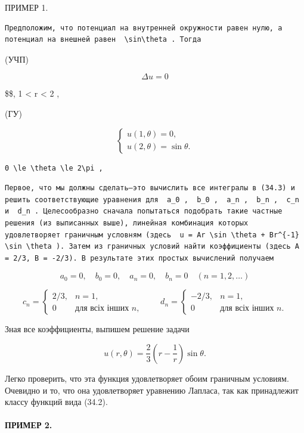 \documentclass[
  ukrainian,
]{article}
\begin{document}
ПРИМЕР 1.

\begin{verbatim}
Предположим, что потенциал на внутренней окружности равен нулю, а потенциал на внешней равен  \sin\theta . Тогда
\end{verbatim}

(УЧП)

\[
\Delta u = 0
\]

\$\$, 1 \textless{} r \textless{} 2 ,

(ГУ)

\[
\begin{cases} u(1, \theta) = 0, \\ u(2, \theta) = \sin \theta. \end{cases}
\]

\begin{verbatim}
0 \le \theta \le 2\pi ,
\end{verbatim}

\begin{verbatim}
Первое, что мы должны сделать—это вычислить все интегралы в (34.3) и решить соответствующие уравнения для  a_0 ,  b_0 ,  a_n ,  b_n ,  c_n  и  d_n . Целесообразно сначала попытаться подобрать такие частные решения (из выписанных выше), линейная комбинация которых удовлетворяет граничным условням (здесь  u = Ar \sin \theta + Br^{-1} \sin \theta ). Затем из граничных условий найти коэффициенты (здесь A = 2/3, B = -2/3). В результате этих простых вычислений получаем
\end{verbatim}

\[
a_0=0, \quad b_0=0, \quad a_n=0, \quad b_n=0 \quad (n=1, 2, \ldots)
\]

\[
c_n=\begin{cases}
2/3, & n=1, \\
0 & \text{для всіх інших } n,
\end{cases}
\qquad
d_n=\begin{cases}
-2/3, & n=1, \\
0 & \text{для всіх інших } n.
\end{cases}
\]

Зная все коэффициенты, выпишем решение задачи

\[
u(r, \theta) = \frac{2}{3} \left(r - \frac{1}{r}\right) \sin \theta.
\]

Легко проверить, что эта функция удовлетворяет обоим граничным условиям.
Очевидно и то, что она удовлетворяет уравнению Лапласа, так как
принадлежит классу функций вида (34.2).

\paragraph{ПРИМЕР 2.}\label{ux43fux440ux438ux43cux435ux440-2.}
\end{document}
